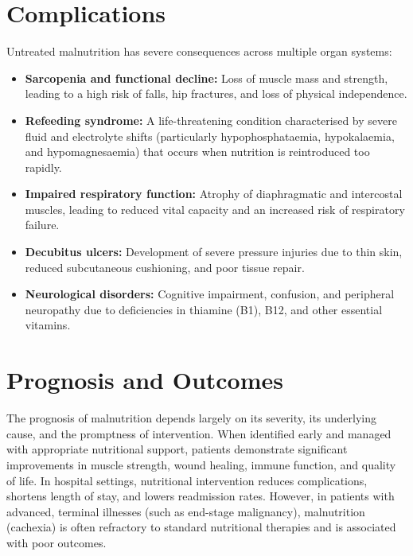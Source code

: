 \section*{Complications}
Untreated malnutrition has severe consequences across multiple organ systems:
\begin{itemize}
    \item \textbf{Sarcopenia and functional decline:} Loss of muscle mass and strength, leading to a high risk of falls, hip fractures, and loss of physical independence.
    \item \textbf{Refeeding syndrome:} A life-threatening condition characterised by severe fluid and electrolyte shifts (particularly hypophosphataemia, hypokalaemia, and hypomagnesaemia) that occurs when nutrition is reintroduced too rapidly.
    \item \textbf{Impaired respiratory function:} Atrophy of diaphragmatic and intercostal muscles, leading to reduced vital capacity and an increased risk of respiratory failure.
    \item \textbf{Decubitus ulcers:} Development of severe pressure injuries due to thin skin, reduced subcutaneous cushioning, and poor tissue repair.
    \item \textbf{Neurological disorders:} Cognitive impairment, confusion, and peripheral neuropathy due to deficiencies in thiamine (B1), B12, and other essential vitamins.
\end{itemize}

\section*{Prognosis and Outcomes}
The prognosis of malnutrition depends largely on its severity, its underlying cause, and the promptness of intervention. When identified early and managed with appropriate nutritional support, patients demonstrate significant improvements in muscle strength, wound healing, immune function, and quality of life. In hospital settings, nutritional intervention reduces complications, shortens length of stay, and lowers readmission rates. However, in patients with advanced, terminal illnesses (such as end-stage malignancy), malnutrition (cachexia) is often refractory to standard nutritional therapies and is associated with poor outcomes.

